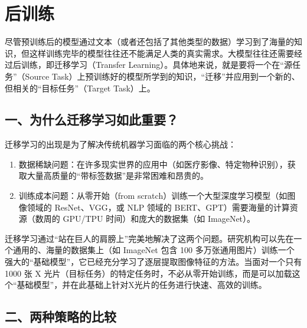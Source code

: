 \setcounter{section}{3}

\hypertarget{ux540eux8badux7ec3}{%
\section{后训练}\label{ux540eux8badux7ec3}}

尽管预训练后的模型通过文本（或者还包括了其他类型的数据）学习到了海量的知识，但这样训练完毕的模型往往还不能满足人类的真实需求。大模型往往还需要经过后训练，即迁移学习（Transfer Learning）。具体地来说，就是要将一个在``源任务''（Source Task）上预训练好的模型所学到的知识，``迁移''并应用到一个新的、但相关的``目标任务''（Target Task）上。

\hypertarget{ux4e00ux4e3aux4ec0ux4e48ux8fc1ux79fbux5b66ux4e60ux5982ux6b64ux91cdux8981}{%
\subsection{一、为什么迁移学习如此重要？}\label{ux4e00ux4e3aux4ec0ux4e48ux8fc1ux79fbux5b66ux4e60ux5982ux6b64ux91cdux8981}}

迁移学习的出现是为了解决传统机器学习面临的两个核心挑战：

\begin{enumerate}
\def\labelenumi{\arabic{enumi}.}
\item
  数据稀缺问题：在许多现实世界的应用中（如医疗影像、特定物种识别），获取大量高质量的``带标签数据''是非常困难和昂贵的。
\item
  训练成本问题：从零开始（from scratch）训练一个大型深度学习模型（如图像领域的 ResNet、VGG，或 NLP 领域的 BERT、GPT）需要海量的计算资源（数周的 GPU/TPU 时间）和庞大的数据集（如 ImageNet）。
\end{enumerate}

迁移学习通过``站在巨人的肩膀上''完美地解决了这两个问题。研究机构可以先在一个通用的、海量的数据集上（如 ImageNet 包含 100 多万张通用图片）训练一个强大的``基础模型''，它已经充分学习了逐层提取图像特征的方法。当面对一个只有 1000 张 X 光片（目标任务）的特定任务时，不必从零开始训练，而是可以加载这个``基础模型''，并在此基础上针对X光片的任务进行快速、高效的训练。

\hypertarget{ux4e8cux4e24ux79cdux7b56ux7565ux7684ux6bd4ux8f83}{%
\subsection{二、两种策略的比较}\label{ux4e8cux4e24ux79cdux7b56ux7565ux7684ux6bd4ux8f83}}

